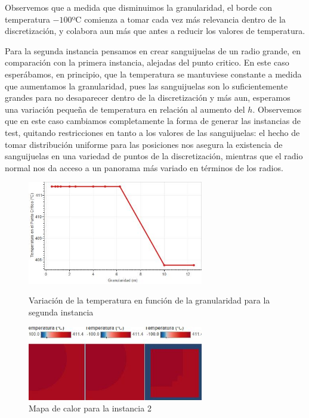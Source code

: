 Observemos que a medida que disminuimos la granularidad, el borde con temperatura $-100$ºC comienza a tomar cada vez más relevancia dentro de la discretización, y colabora aun más que antes a reducir los valores de temperatura.

\pagebreak

Para la segunda instancia pensamos en crear sanguijuelas de un radio grande, en comparación con la primera instancia, alejadas del punto critico. En este caso esperábamos, en principio, que la temperatura se mantuviese constante a medida que aumentamos la granularidad, pues las sanguijuelas son lo suficientemente grandes para no desaparecer dentro de la discretización y más aun, esperamos una variación pequeña de temperatura en relación al aumento del $h$. Observemos que en este caso cambiamos completamente la forma de generar las instancias de test, quitando restricciones en tanto a los valores de las sanguijuelas: el hecho de tomar distribución uniforme para las posiciones nos asegura la existencia de sanguijuelas en una variedad de puntos de la discretización, mientras que el radio normal nos da acceso a un panorama más variado en términos de los radios.

\begin{figure}[b]
    \centering
    \includegraphics[width=0.685\textwidth]{experimento 1-2}
    \caption{Variación de la temperatura en función de la granularidad para la segunda instancia}
    \label{fig:exp12}
    
    \includegraphics[width=0.685\textwidth]{Ejemplo Instancia 2}
    \caption{Mapa de calor para la instancia 2}
    \label{fig:exp12-vis}
\end{figure}

